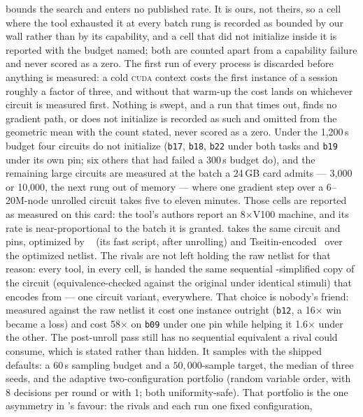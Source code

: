 bounds the search and enters no published rate. It is ours, not theirs, so a cell
where the tool exhausted it at every batch rung is recorded as bounded by our wall rather than
by its capability, and a cell that did not initialize inside it is reported with the budget
named; both are counted apart from a capability failure and never scored as a zero. The first run of every process is discarded before anything is measured: a
cold \textsc{cuda} context costs the first instance of a session roughly a factor of three, and
without that warm-up the cost lands on whichever circuit is measured first. Nothing is swept, and a
run that times out, finds no gradient path, or does not initialize is recorded as such and
omitted from the geometric mean with the count stated, never scored as a zero. Under the
1{,}200\,s budget four circuits do not initialize (\texttt{b17}, \texttt{b18}, \texttt{b22}
under both tasks and \texttt{b19} under its own pin; six others that had failed a 300\,s budget
do), and the remaining large circuits are measured at the batch a 24\,GB card admits ---
3{,}000 or 10{,}000, the next rung out of memory --- where one gradient step over a 6--20M-node
unrolled circuit takes five to eleven minutes. Those cells are reported as measured on this
card: the tool's authors report an 8$\times$V100 machine, and its rate is near-proportional to
the batch it is granted.
\gpap{} takes the same circuit and pins, optimized by \abctool{}~\cite{brayton_abc_2010} (its
fast script, after unrolling) and Tseitin-encoded~\cite{tseitin_complexity_1983} over the
optimized netlist. The rivals are not left holding the raw netlist for that reason: every tool,
in every cell, is handed the same sequential \abctool{}-simplified copy of the circuit
(equivalence-checked against the original under identical stimuli) that \gpap{} encodes from
--- one circuit variant, everywhere. That choice is nobody's friend: measured against the raw
netlist it cost \gpap{} one instance outright (\texttt{b12}, a 16$\times$ win became a loss) and
cost \recurrent{} 58$\times$ on \texttt{b09} under one pin while helping it 1.6$\times$ under the
other. The post-unroll pass still has no sequential equivalent a rival could consume, which is
stated rather than hidden. It samples with
the shipped defaults: a 60\,s sampling budget and a $50{,}000$-sample target, the median of
three seeds, and the adaptive two-configuration portfolio (random variable order, with 8
decisions per round or with 1; both uniformity-safe). That portfolio is the one
asymmetry in \gpap{}'s favour: the rivals and \cmsgen{} each run one fixed configuration,
